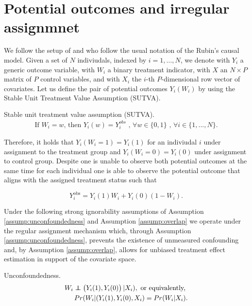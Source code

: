 \chapter{Potential outcomes and irregular assignmnet}

We follow the setup of \cite{bargagli_stoffi_causal_2020} and \cite{bargagli-stoffi_heterogeneous_2022} who follow the usual notation of the Rubin's causal model. Given a set of $N$ indiviudals, indexed by $i = 1, \ldots, N$, we denote with $Y_i$ a generic outcome variable, with $W_i$ a binary treatment indicator, with $X$ an $N \times P$ matrix of $P$ control variables, and with $X_i$ the $i$-th $P$-dimensional row vector of covariates.
Let us define the pair of potential outcomes $Y_i(W_i)$ by using the Stable Unit Treatment Value Assumption (SUTVA). 
\begin{assump}{Stable unit treatment value assumption (SUTVA).}
   \label{assump:SUTVA} \\
   \begin{align*}
   \label{SUTVA}
   \text{If } W_i = w \text{, then } Y_i(w) = Y_i^{obs} \text{ , } \forall w \in \{0, 1 \} \text{ , } \forall i \in \{1, ..., N \}. 
   \end{align*}
\end{assump}
Therefore, it holds that $Y_i(W_i = 1) = Y_i(1)$ for an indiviudal $i$ under assignment to the treatment group and $Y_i(W_i = 0) = Y_i(0)$ under assignment to control group.
Despite one is unable to observe both potential outcomes at the same time for each individual one is able to observe the potential outcome that aligns with the assigned treatment status such that

\[
Y_i^{\text{obs}} = Y_i(1)W_i + Y_i(0)(1 - W_i).
\]

Under the following strong ignorability assumptions of Assumption \ref{assump:unconfoundedness} and Assumption \ref{assump:overlap} we operate under the regular assignment mechanism which, through Assumption \ref{assump:unconfoundedness}, prevents the existence of unmeasured confounding and, by Assumption \ref{assump:overlap}, allows for unbiased treatment effect estimation in support of the covariate space. 

\begin{assump}{Unconfoundedness.}
   \label{assump:unconfoundedness} \\
   \begin{align*}
   W_i \perp\!\!\!\!\perp \left(Y_i(1), Y_i(0)\right) |X_i), \text{ or equivalently, } \\
   Pr(W_i | (Y_i(1), Y_i(0), X_i) = Pr(W_i | X_i).   
   \end{align*}
\end{assump}

